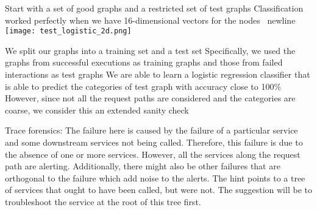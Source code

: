 Start with a set of good graphs and a restricted set of test graphs
Classification worked perfectly when we have 16-dimensional vectors for the nodes \ newline
\texttt{[image: test\_logistic\_2d.png]} \newline

We split our graphs into a training set and a test set
Specifically, we used the graphs from successful executions as training graphs and those from failed interactions as test graphs
We are able to learn a logistic regression classifier that is able to predict the categories of test graph with accuracy close to 100\%
However, since not all the request paths are considered and the categories are coarse, we consider this an extended sanity check

Trace forensics: \newline
The failure here is caused by the failure of a particular service and some downstream services not being called. 
Therefore, this failure is due to the absence of one or more services.
However, all the services along the request path are alerting.
Additionally, there might also be other failures that are orthogonal to the failure which add noise to the alerts.
The hint points to a tree of services that ought to have been called, but were not. The suggestion will be to troubleshoot the service at the root of this tree first.

